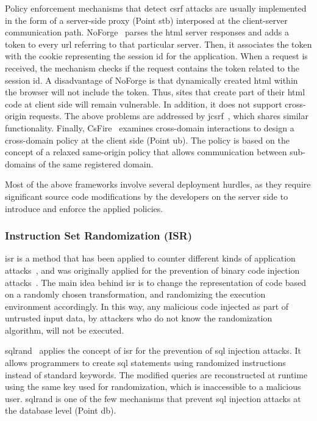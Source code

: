 \documentclass[10pt,journal,compsoc]{IEEEtran}
\begin{document}
Policy enforcement mechanisms that detect {\sc csrf}
attacks are usually implemented in the form of a
server-side proxy (Point {\sc s}t{\sc b})
interposed at the client-server communication path.
NoForge~\cite{JKK06a}
parses the {\sc html} server responses
and adds a token to every {\sc url} referring to that particular
server. Then, it associates the token with the cookie
representing the session {\sc id} for the application.
When a request is received, the mechanism checks
if the request contains the token related
to the session {\sc id}. A disadvantage of NoForge
is that  dynamically created {\sc html} within
the browser will not include the token.
Thus, sites that create part of their {\sc html} code at client side
will remain vulnerable. In addition, it does not
support cross-origin requests.
The above problems are addressed by j{\sc csrf}~\cite{PS11},
which shares similar functionality.
Finally, CsFire~\cite{DDHPJ10}
examines cross-domain interactions to design a
cross-domain policy at the client side (Point {\sc ub}).
The policy is based on the concept of a relaxed
same-origin policy that allows communication between
sub-domains of the same registered domain.

Most of the above frameworks involve
several deployment hurdles, as they
require significant source code modifications by the
developers on the server side to introduce and enforce
the applied policies.

\subsubsection{Instruction Set Randomization (ISR)}

{\sc isr} is a method that has been applied to counter different kinds
of application attacks~\cite{K09b}, and was originally applied for the
prevention of binary code injection attacks~\cite{KKP03, isr03forrest}.
The main idea behind {\sc isr} is
to change the representation of code
based on a randomly chosen transformation,
and randomizing the execution environment accordingly.
In this way, any malicious code injected as part of untrusted input data,
by attackers who do not know the randomization algorithm,
will not be executed.

{\sc sql}rand~\cite{BK04} applies the concept of {\sc isr} for the prevention
of {\sc sql} injection attacks. It allows programmers to create {\sc sql}
statements using randomized instructions instead of standard keywords.
The modified queries are reconstructed at runtime using the same key
used for randomization, which is inaccessible to a malicious user.
{\sc sql}rand is one of the few mechanisms that prevent {\sc sql}
injection attacks at the database level (Point {\sc db}).
\end{document}
